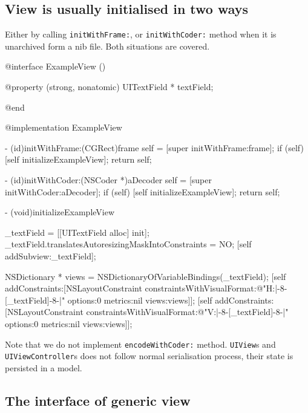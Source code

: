 \documentclass[10pt]{extarticle}
\newenvironment{codelisting}
{\footnotesize\mdframed[middlelinewidth=0.5pt, middlelinecolor=BaliHaiColor, skipabove=15pt]\verbatim}
{\endverbatim\endmdframed\vspace{12pt}\normalsize}
\newcommand{\inlinecode}[1]{{\textcolor{TundoraColor}{\texttt{#1}}}}
\begin{document}
\subsection{View is usually initialised in two ways}

Either by calling \inlinecode{initWithFrame:}, or \inlinecode{initWithCoder:} method when it is unarchived form a nib file. Both situations are covered.

\begin{codelisting}
@interface ExampleView ()

@property (strong, nonatomic) UITextField * textField;

@end

@implementation ExampleView

- (id)initWithFrame:(CGRect)frame
{
    self = [super initWithFrame:frame];
    if (self) {
        [self initializeExampleView];
    }
    return self;
}

- (id)initWithCoder:(NSCoder *)aDecoder
{
    self = [super initWithCoder:aDecoder];
    if (self) {
        [self initializeExampleView];
    }
    return self;
}

- (void)initializeExampleView
{
    _textField = [[UITextField alloc] init];
    _textField.translatesAutoresizingMaskIntoConstraints = NO;
    [self addSubview:_textField];
    
    NSDictionary * views = NSDictionaryOfVariableBindings(_textField);
    [self addConstraints:[NSLayoutConstraint constraintsWithVisualFormat:@"H:|-8-[_textField]-8-|"
                                                                 options:0
                                                                 metrics:nil
                                                                   views:views]];
    [self addConstraints:[NSLayoutConstraint constraintsWithVisualFormat:@"V:|-8-[_textField]-8-|"
                                                                 options:0
                                                                 metrics:nil
                                                                   views:views]];
}
\end{codelisting}

Note that we do not implement \inlinecode{encodeWithCoder:} method. \inlinecode{UIView}s and \inlinecode{UIViewController}s does not follow normal serialisation process, their state is persisted in a model.


\subsection{The interface of generic view}
\end{document}
